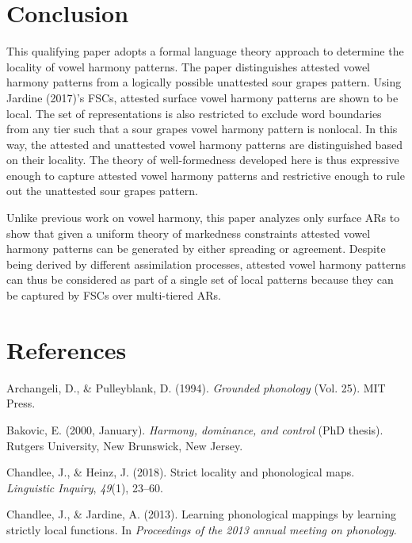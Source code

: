 \documentclass[,doc,floatsintext]{apa6}
\theoremstyle{definition}
\theoremstyle{definition}
\theoremstyle{definition}
\theoremstyle{remark}
\begin{document}
\section{Conclusion}\label{conclusion}

This qualifying paper adopts a formal language theory approach to
determine the locality of vowel harmony patterns. The paper
distinguishes attested vowel harmony patterns from a logically possible
unattested sour grapes pattern. Using Jardine (2017)'s FSCs, attested
surface vowel harmony patterns are shown to be local. The set of
representations is also restricted to exclude word boundaries from any
tier such that a sour grapes vowel harmony pattern is nonlocal. In this
way, the attested and unattested vowel harmony patterns are
distinguished based on their locality. The theory of well-formedness
developed here is thus expressive enough to capture attested vowel
harmony patterns and restrictive enough to rule out the unattested sour
grapes pattern.

Unlike previous work on vowel harmony, this paper analyzes only surface
ARs to show that given a uniform theory of markedness constraints
attested vowel harmony patterns can be generated by either spreading or
agreement. Despite being derived by different assimilation processes,
attested vowel harmony patterns can thus be considered as part of a
single set of local patterns because they can be captured by FSCs over
multi-tiered ARs.

\newpage

\section{References}\label{references}

\setlength{\parindent}{-0.5in} \setlength{\leftskip}{0.5in}

\hypertarget{refs}{}
\hypertarget{ref-archangelipulleyblank1994}{}
Archangeli, D., \& Pulleyblank, D. (1994). \emph{Grounded phonology}
(Vol. 25). MIT Press.

\hypertarget{ref-bakovic2000}{}
Bakovic, E. (2000, January). \emph{Harmony, dominance, and control}
(PhD thesis). Rutgers University, New Brunswick, New Jersey.

\hypertarget{ref-chandleeheinz2018}{}
Chandlee, J., \& Heinz, J. (2018). Strict locality and phonological
maps. \emph{Linguistic Inquiry}, \emph{49}(1), 23--60.

\hypertarget{ref-chandleejardine2013}{}
Chandlee, J., \& Jardine, A. (2013). Learning phonological mappings by
learning strictly local functions. In \emph{Proceedings of the 2013
annual meeting on phonology}.
\end{document}
